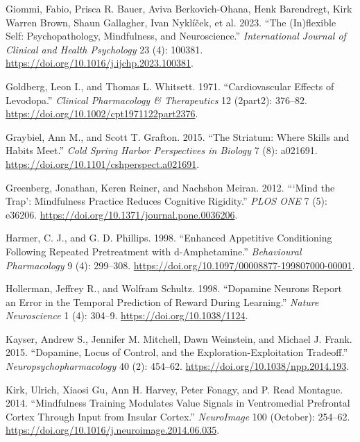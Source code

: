 \documentclass{article}
\newlength{\cslhangindent}
\newlength{\cslentryspacingunit} %
\newenvironment{CSLReferences}[2] %
 {%
  \setlength{\parindent}{0pt}
  \ifodd #1
  \let\oldpar\par
  \def\par{\hangindent=\cslhangindent\oldpar}
  \fi
  \setlength{\parskip}{#2\cslentryspacingunit}
 }%
 {}
\begin{document}
\begin{CSLReferences}{1}{0}
\leavevmode{}%
Giommi, Fabio, Prisca R. Bauer, Aviva Berkovich-Ohana, Henk Barendregt,
Kirk Warren Brown, Shaun Gallagher, Ivan Nyklíček, et al. 2023. {``The
({In})flexible Self: {Psychopathology}, Mindfulness, and
Neuroscience.''} \emph{International Journal of Clinical and Health
Psychology} 23 (4): 100381.
\url{https://doi.org/10.1016/j.ijchp.2023.100381}.

\leavevmode{}%
Goldberg, Leon I., and Thomas L. Whitsett. 1971. {``Cardiovascular
Effects of Levodopa.''} \emph{Clinical Pharmacology \& Therapeutics} 12
(2part2): 376--82. \url{https://doi.org/10.1002/cpt1971122part2376}.

\leavevmode{}%
Graybiel, Ann M., and Scott T. Grafton. 2015. {``The {Striatum}: {Where
Skills} and {Habits Meet}.''} \emph{Cold Spring Harbor Perspectives in
Biology} 7 (8): a021691.
\url{https://doi.org/10.1101/cshperspect.a021691}.

\leavevmode{}%
Greenberg, Jonathan, Keren Reiner, and Nachshon Meiran. 2012.
{``{`{Mind} the {Trap}'}: {Mindfulness Practice Reduces Cognitive
Rigidity}.''} \emph{PLOS ONE} 7 (5): e36206.
\url{https://doi.org/10.1371/journal.pone.0036206}.

\leavevmode{}%
Harmer, C. J., and G. D. Phillips. 1998. {``Enhanced Appetitive
Conditioning Following Repeated Pretreatment with d-Amphetamine.''}
\emph{Behavioural Pharmacology} 9 (4): 299--308.
\url{https://doi.org/10.1097/00008877-199807000-00001}.

\leavevmode{}%
Hollerman, Jeffrey R., and Wolfram Schultz. 1998. {``Dopamine Neurons
Report an Error in the Temporal Prediction of Reward During Learning.''}
\emph{Nature Neuroscience} 1 (4): 304--9.
\url{https://doi.org/10.1038/1124}.

\leavevmode{}%
Kayser, Andrew S., Jennifer M. Mitchell, Dawn Weinstein, and Michael J.
Frank. 2015. {``Dopamine, {Locus} of {Control}, and the
{Exploration-Exploitation Tradeoff}.''} \emph{Neuropsychopharmacology}
40 (2): 454--62. \url{https://doi.org/10.1038/npp.2014.193}.

\leavevmode{}%
Kirk, Ulrich, Xiaosi Gu, Ann H. Harvey, Peter Fonagy, and P. Read
Montague. 2014. {``Mindfulness Training Modulates Value Signals in
Ventromedial Prefrontal Cortex Through Input from Insular Cortex.''}
\emph{NeuroImage} 100 (October): 254--62.
\url{https://doi.org/10.1016/j.neuroimage.2014.06.035}.


\end{CSLReferences}
\end{document}
